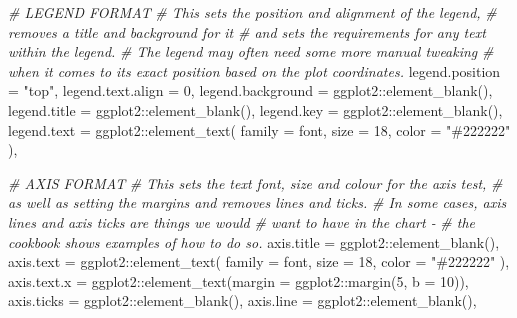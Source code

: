 \documentclass[
]{book}
\newenvironment{Shaded}{\begin{snugshade}}{\end{snugshade}}
\newcommand{\AttributeTok}[1]{\textcolor[rgb]{0.77,0.63,0.00}{#1}}
\newcommand{\CommentTok}[1]{\textcolor[rgb]{0.56,0.35,0.01}{\textit{#1}}}
\newcommand{\DecValTok}[1]{\textcolor[rgb]{0.00,0.00,0.81}{#1}}
\newcommand{\FunctionTok}[1]{\textcolor[rgb]{0.00,0.00,0.00}{#1}}
\newcommand{\NormalTok}[1]{#1}
\newcommand{\SpecialCharTok}[1]{\textcolor[rgb]{0.00,0.00,0.00}{#1}}
\newcommand{\StringTok}[1]{\textcolor[rgb]{0.31,0.60,0.02}{#1}}
\begin{document}
\begin{Shaded}
\begin{Highlighting}[]
    \CommentTok{\# LEGEND FORMAT}
    \CommentTok{\# This sets the position and alignment of the legend, }
    \CommentTok{\# removes a title and background for it}
    \CommentTok{\# and sets the requirements for any text within the legend.}
    \CommentTok{\# The legend may often need some more manual tweaking }
    \CommentTok{\# when it comes to its exact position based on the plot coordinates.}
    \AttributeTok{legend.position =} \StringTok{"top"}\NormalTok{,}
    \AttributeTok{legend.text.align =} \DecValTok{0}\NormalTok{,}
    \AttributeTok{legend.background =}\NormalTok{ ggplot2}\SpecialCharTok{::}\FunctionTok{element\_blank}\NormalTok{(),}
    \AttributeTok{legend.title =}\NormalTok{ ggplot2}\SpecialCharTok{::}\FunctionTok{element\_blank}\NormalTok{(),}
    \AttributeTok{legend.key =}\NormalTok{ ggplot2}\SpecialCharTok{::}\FunctionTok{element\_blank}\NormalTok{(),}
    \AttributeTok{legend.text =}\NormalTok{ ggplot2}\SpecialCharTok{::}\FunctionTok{element\_text}\NormalTok{(}
      \AttributeTok{family =}\NormalTok{ font,}
      \AttributeTok{size =} \DecValTok{18}\NormalTok{,}
      \AttributeTok{color =} \StringTok{"\#222222"}
\NormalTok{    ),}
    
    \CommentTok{\# AXIS FORMAT}
    \CommentTok{\# This sets the text font, size and colour for the axis test, }
    \CommentTok{\# as well as setting the margins and removes lines and ticks.}
    \CommentTok{\# In some cases, axis lines and axis ticks are things we would }
    \CommentTok{\# want to have in the chart {-} }
    \CommentTok{\# the cookbook shows examples of how to do so.}
    \AttributeTok{axis.title =}\NormalTok{ ggplot2}\SpecialCharTok{::}\FunctionTok{element\_blank}\NormalTok{(),}
    \AttributeTok{axis.text =}\NormalTok{ ggplot2}\SpecialCharTok{::}\FunctionTok{element\_text}\NormalTok{(}
      \AttributeTok{family =}\NormalTok{ font,}
      \AttributeTok{size =} \DecValTok{18}\NormalTok{,}
      \AttributeTok{color =} \StringTok{"\#222222"}
\NormalTok{    ),}
    \AttributeTok{axis.text.x =}\NormalTok{ ggplot2}\SpecialCharTok{::}\FunctionTok{element\_text}\NormalTok{(}\AttributeTok{margin =}\NormalTok{ ggplot2}\SpecialCharTok{::}\FunctionTok{margin}\NormalTok{(}\DecValTok{5}\NormalTok{, }\AttributeTok{b =} \DecValTok{10}\NormalTok{)),}
    \AttributeTok{axis.ticks =}\NormalTok{ ggplot2}\SpecialCharTok{::}\FunctionTok{element\_blank}\NormalTok{(),}
    \AttributeTok{axis.line =}\NormalTok{ ggplot2}\SpecialCharTok{::}\FunctionTok{element\_blank}\NormalTok{(),}
    

\end{Highlighting}
\end{Shaded}
\end{document}
